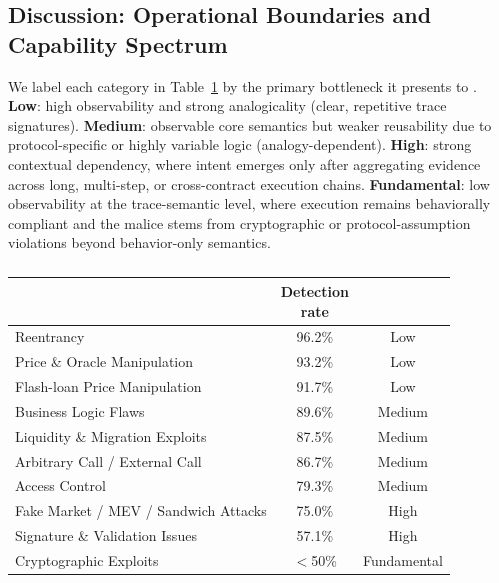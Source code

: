 \subsection{Discussion: Operational Boundaries and Capability Spectrum}


We label each category in Table~\ref{tab:capability_spectrum} by the primary bottleneck it presents to \approach{}. \textbf{Low}: high observability and strong analogicality (clear, repetitive trace signatures). \textbf{Medium}: observable core semantics but weaker reusability due to protocol-specific or highly variable logic (analogy-dependent). \textbf{High}: strong contextual dependency, where intent emerges only after aggregating evidence across long, multi-step, or cross-contract execution chains. \textbf{Fundamental}: low observability at the trace-semantic level, where execution remains behaviorally compliant and the malice stems from cryptographic or protocol-assumption violations beyond behavior-only semantics.


\begin{table}[t]
	\centering
	\caption{}
	\label{tab:capability_spectrum}
	\small
\setlength{\tabcolsep}{3pt}
	\begin{tabular}{@{}>{\raggedright\arraybackslash}p{}cc@{}}
		\toprule
		\text{Type} & \makecell{Detection\\rate} & \text{Difficulty} \\
		\midrule
		Reentrancy & 96.2\% & Low \\
        Price \& Oracle Manipulation & 93.2\% & Low \\
		Flash-loan Price Manipulation & 91.7\% & Low \\
		Business Logic Flaws & 89.6\% & Medium \\
		Liquidity \& Migration Exploits & 87.5\% & Medium \\
		Arbitrary Call / External Call & 86.7\% & Medium \\
		Access Control & 79.3\% & Medium \\
		Fake Market / MEV / Sandwich Attacks & 75.0\% & High \\
		Signature \& Validation Issues & 57.1\% & High \\
		Cryptographic Exploits  & $<$50\% & Fundamental \\
		\bottomrule
	\end{tabular}
	
	\smallskip\scriptsize{}
\end{table}


